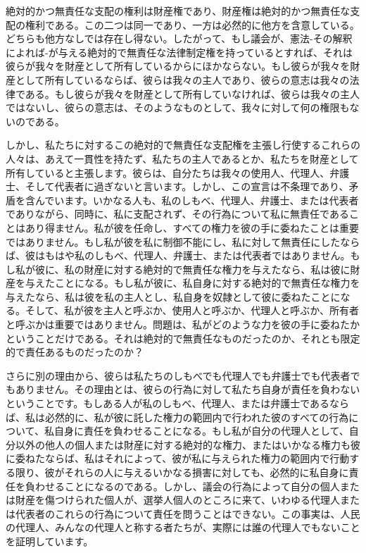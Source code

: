 \documentclass[dvipdfmx, uplatex, tate, landscape]{utbook}
\begin{document}
絶対的かつ無責任な支配の権利は財産権であり、財産権は絶対的かつ無責任な支配の権利である。この二つは同一であり、一方は必然的に他方を含意している。どちらも他方なしでは存在し得ない。したがって、もし議会が、憲法-その解釈によれば-が与える絶対的で無責任な法律制定権を持っているとすれば、それは彼らが我々を財産として所有しているからにほかならない。もし彼らが我々を財産として所有しているならば、彼らは我々の主人であり、彼らの意志は我々の法律である。もし彼らが我々を財産として所有していなければ、彼らは我々の主人ではないし、彼らの意志は、そのようなものとして、我々に対して何の権限もないのである。

しかし、私たちに対するこの絶対的で無責任な支配権を主張し行使するこれらの人々は、あえて一貫性を持たず、私たちの主人であるとか、私たちを財産として所有していると主張します。彼らは、自分たちは我々の使用人、代理人、弁護士、そして代表者に過ぎないと言います。しかし、この宣言は不条理であり、矛盾を含んでいます。いかなる人も、私のしもべ、代理人、弁護士、または代表者でありながら、同時に、私に支配されず、その行為について私に無責任であることはあり得ません。私が彼を任命し、すべての権力を彼の手に委ねたことは重要ではありません。もし私が彼を私に制御不能にし、私に対して無責任にしたならば、彼はもはや私のしもべ、代理人、弁護士、または代表者ではありません。もし私が彼に、私の財産に対する絶対的で無責任な権力を与えたなら、私は彼に財産を与えたことになる。もし私が彼に、私自身に対する絶対的で無責任な権力を与えたなら、私は彼を私の主人とし、私自身を奴隷として彼に委ねたことになる。そして、私が彼を主人と呼ぶか、使用人と呼ぶか、代理人と呼ぶか、所有者と呼ぶかは重要ではありません。問題は、私がどのような力を彼の手に委ねたかということだけである。それは絶対的で無責任なものだったのか、それとも限定的で責任あるものだったのか？

さらに別の理由から、彼らは私たちのしもべでも代理人でも弁護士でも代表者でもありません。その理由とは、彼らの行為に対して私たち自身が責任を負わないということです。もしある人が私のしもべ、代理人、または弁護士であるならば、私は必然的に、私が彼に託した権力の範囲内で行われた彼のすべての行為について、私自身に責任を負わせることになる。もし私が自分の代理人として、自分以外の他人の個人または財産に対する絶対的な権力、またはいかなる権力も彼に委ねたならば、私はそれによって、彼が私に与えられた権力の範囲内で行動する限り、彼がそれらの人に与えるいかなる損害に対しても、必然的に私自身に責任を負わせることになるのである。しかし、議会の行為によって自分の個人または財産を傷つけられた個人が、選挙人個人のところに来て、いわゆる代理人または代表者のこれらの行為について責任を問うことはできない。この事実は、人民の代理人、みんなの代理人と称する者たちが、実際には誰の代理人でもないことを証明しています。
\end{document}
